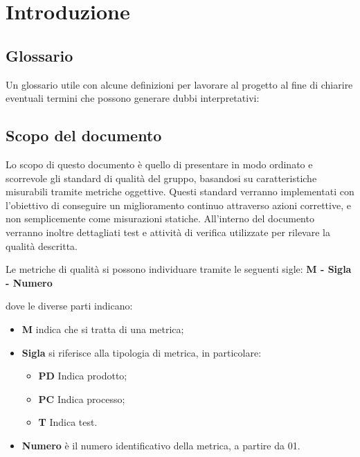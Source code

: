 \chapter{Introduzione}

\section{Glossario}
Un glossario utile con alcune definizioni per lavorare al progetto al fine di chiarire eventuali termini che possono generare dubbi interpretativi:

\section{Scopo del documento}
Lo scopo di questo documento è quello di presentare in modo ordinato e scorrevole gli standard di qualità del gruppo, basandosi su caratteristiche misurabili tramite metriche oggettive. Questi standard verranno implementati con l'obiettivo di conseguire un miglioramento continuo attraverso azioni correttive, e non semplicemente come misurazioni statiche. All'interno del documento verranno inoltre dettagliati test e attività di verifica utilizzate per rilevare la qualità descritta.

Le metriche di qualità si possono individuare tramite le seguenti sigle: \textbf{M - Sigla - Numero}

dove le diverse parti indicano:

\begin{itemize}
    \item \textbf{M} indica che si tratta di una metrica;
    \item \textbf{Sigla} si riferisce alla tipologia di metrica, in particolare:
    \begin{itemize}
        \item \textbf{PD} Indica prodotto;
        \item \textbf{PC} Indica processo;
        \item \textbf{T} Indica test.
    \end{itemize}
    \item \textbf{Numero} è il numero identificativo della metrica, a partire da 01.
\end{itemize}